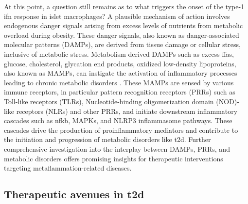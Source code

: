 \par At this point, a question still remains as to what triggers the onset of the type-1 \gls{ifn} response in islet macrophages? A plausible mechanism of action involves endogenous danger signals arising from excess levels of nutrients from metabolic overload during obesity. These danger signals, also known as danger-associated molecular patterns (DAMPs), are derived from tissue damage or cellular stress, inclusive of metabolic stress. Metabolism-derived DAMPs such as excess \glspl{ffa}, glucose, cholesterol, glycation end products, oxidized low-density lipoproteins, also known as MAMPs, can instigate the activation of inflammatory processes leading to chronic metabolic disorders \textbf{\cite{https://doi.org/10.1016/j.tem.2020.07.001}}. These MAMPs are sensed by various immune receptors, in particular pattern recognition receptors (PRRs) such as Toll-like receptors (TLRs), Nucleotide-binding oligomerization domain (NOD)-like receptors (NLRs) and other PRRs, and initiate downstream inflammatory cascades such as \gls{nfkb}, MAPKs, and NLRP3 inflammasome pathways. These cascades drive the production of proinflammatory mediators and contribute to the initiation and progression of metabolic disorders like \gls{t2d}. Further comprehensive investigation into the interplay between DAMPs, PRRs, and metabolic disorders offers promising insights for therapeutic interventions targeting metaflammation-related diseases.\\ 


\subsection{Therapeutic avenues in \gls{t2d}}





